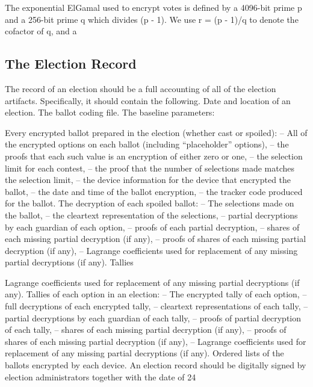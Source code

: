 The exponential ElGamal used to encrypt votes is defined by a 4096-bit prime p and a 256-bit prime q which divides (p -
1). We use r = (p - 1)/q to denote the cofactor of q, and a
\cite[21]{eg-spec}

\subsection{The Election Record}
The record of an election should be a full accounting of all of the election artifacts. Specifically, it should contain
the following. Date and location of an election. The ballot coding file. The baseline parameters:
\cite[24]{eg-spec}



Every encrypted ballot prepared in the election (whether cast or spoiled): – All of the encrypted options on each ballot
(including “placeholder” options), – the proofs that each such value is an encryption of either zero or one, – the
selection limit for each contest, – the proof that the number of selections made matches the selection limit, – the
device information for the device that encrypted the ballot, – the date and time of the ballot encryption, – the tracker
code produced for the ballot. The decryption of each spoiled ballot: – The selections made on the ballot, – the
cleartext representation of the selections, – partial decryptions by each guardian of each option, – proofs of each
partial decryption, – shares of each missing partial decryption (if any), – proofs of shares of each missing partial
decryption (if any), – Lagrange coefficients used for replacement of any missing partial decryptions (if any). Tallies
\cite[24]{eg-spec}


Lagrange coefficients used for replacement of any missing partial decryptions (if any). Tallies of each option in an
election: – The encrypted tally of each option, – full decryptions of each encrypted tally, – cleartext representations
of each tally, – partial decryptions by each guardian of each tally, – proofs of partial decryption of each tally, –
shares of each missing partial decryption (if any), – proofs of shares of each missing partial decryption (if any), –
Lagrange coefficients used for replacement of any missing partial decryptions (if any). Ordered lists of the ballots
encrypted by each device. An election record should be digitally signed by election administrators together with the
date of 24
\cite[24]{eg-spec}

